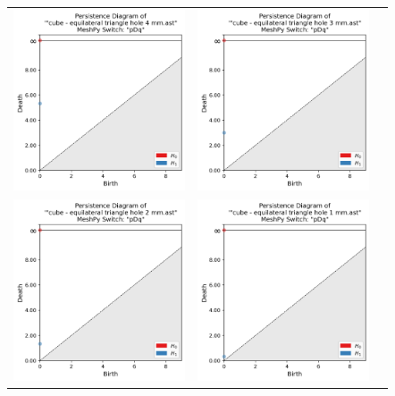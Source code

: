 \documentclass[ma]{uncgdissertationexp}
\theoremstyle{plain}
\theoremstyle{definition}
\theoremstyle{remark}
\begin{document}
\begin{table}[H]
\begin{center}
\begin{tabular}{ccc}
         \includegraphics[width=2in]{Final Run, (cube - equilateral triangle hole 4 mm) persdia.png} & 
         \includegraphics[width=2in]{Final Run, (cube - equilateral triangle hole 3 mm) persdia.png} \\
         \includegraphics[width=2in]{Final Run, (cube - equilateral triangle hole 2 mm) persdia.png} & 
         \includegraphics[width=2in]{Final Run, (cube - equilateral triangle hole 1 mm) persdia.png} & 

\end{tabular}
\end{center}
\end{table}
\end{document}
